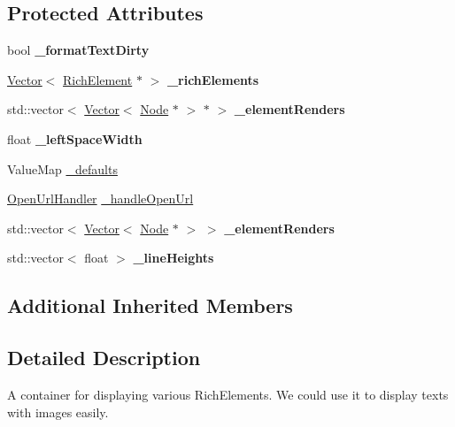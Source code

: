\subsection*{Protected Attributes}
\begin{DoxyCompactItemize}
\item 
\mbox{\label{classui_1_1RichText_a2379dbc82de32cdea75461965a364ae6}} 
bool {\bfseries \+\_\+format\+Text\+Dirty}
\item 
\mbox{\label{classui_1_1RichText_a1491541783b70dcecf307736674973fb}} 
\hyperlink{classVector}{Vector}$<$ \hyperlink{classui_1_1RichElement}{Rich\+Element} $\ast$ $>$ {\bfseries \+\_\+rich\+Elements}
\item 
\mbox{\label{classui_1_1RichText_abb331d66614a702b8691157948e5354f}} 
std\+::vector$<$ \hyperlink{classVector}{Vector}$<$ \hyperlink{classNode}{Node} $\ast$ $>$ $\ast$ $>$ {\bfseries \+\_\+element\+Renders}
\item 
\mbox{\label{classui_1_1RichText_a70f35439756b3cd490b4e2fc873e77ea}} 
float {\bfseries \+\_\+left\+Space\+Width}
\item 
Value\+Map \hyperlink{classui_1_1RichText_ad6f6ba7e12a897612068df6d93b1f9b6}{\+\_\+defaults}
\item 
\hyperlink{classui_1_1RichText_ad3631ae61d204f1d9576f5923bbd762e}{Open\+Url\+Handler} \hyperlink{classui_1_1RichText_adc716a3556a97f5b034caf78e8e30276}{\+\_\+handle\+Open\+Url}
\item 
\mbox{\label{classui_1_1RichText_ae3d80b7a7aae94c72ce01e25e613383f}} 
std\+::vector$<$ \hyperlink{classVector}{Vector}$<$ \hyperlink{classNode}{Node} $\ast$ $>$ $>$ {\bfseries \+\_\+element\+Renders}
\item 
\mbox{\label{classui_1_1RichText_aba64a955fd50ca2d5ab428dce55098da}} 
std\+::vector$<$ float $>$ {\bfseries \+\_\+line\+Heights}
\end{DoxyCompactItemize}
\subsection*{Additional Inherited Members}


\subsection{Detailed Description}
A container for displaying various Rich\+Elements. We could use it to display texts with images easily. 

